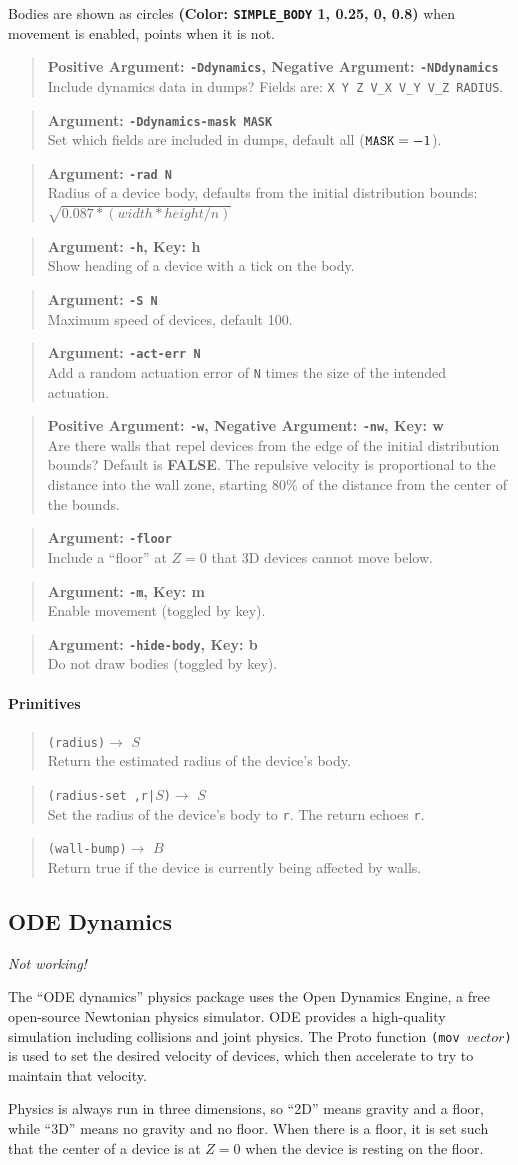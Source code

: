 \documentclass{article}
\newcommand\broken{{\em Not working!}}
\newcommand\false{{\bf FALSE}}
\newcommand\var[1]{{\tt #1}}
\newcommand\key[1]{{\bf #1}}
\newcommand\simarg[2]{\begin{quote} {\bf Argument: \var{#1}} \\ #2 \end{quote}}
\newcommand\simargkey[3]{
  \begin{quote} {\bf Argument: \var{#1}, Key: \key{#2}} \\ #3 \end{quote}
}
\newcommand\simPMarg[3]{
  \begin{quote}
    {\bf Positive Argument: \var{#1}, Negative Argument: \var{#2}} \\ #3
  \end{quote}
}
\newcommand\simPMargkey[4]{
  \begin{quote}
    {\bf Positive Argument: \var{#1}, Negative Argument: \var{#2}, 
      Key: \key{#3}} \\ #4
  \end{quote}
}
\newcommand\color[5]{{\bf (Color: {\tt #1} #2, #3, #4, #5)}} %
\newcommand\function[3]
{\begin{quote}{\tt #1}$\rightarrow$ \type{#2} \\ #3 \end{quote}}
\newcommand\type[1]{$#1$}
\begin{document}
Bodies are shown as circles \color{SIMPLE\_BODY}{1}{0.25}{0}{0.8} when
movement is enabled, points when it is not.

\simPMarg{-Ddynamics}{-NDdynamics}{Include dynamics data in dumps?
  Fields are: \var{X Y Z V\_X V\_Y V\_Z RADIUS}.}
\simarg{-Ddynamics-mask MASK}{Set which fields are included in 
  dumps, default all ($\var{MASK}=-1$).}

\simarg{-rad N}{Radius of a device body, defaults from the initial
  distribution bounds: $\sqrt{0.087*(width*height/n)}$}
\simargkey{-h}{h}{Show heading of a device with a tick on the body.}
\simarg{-S N}{Maximum speed of devices, default 100.}
\simarg{-act-err N}{Add a random actuation error of \var{N} times the
  size of the intended actuation.}
\simPMargkey{-w}{-nw}{w}{Are there walls that repel devices from the
  edge of the initial distribution bounds?  Default is \false{}. The
  repulsive velocity is proportional to the distance into the wall
  zone, starting 80\% of the distance from the center of the bounds.}
\simarg{-floor}{Include a ``floor'' at $Z=0$ that 3D devices cannot
  move below.}
\simargkey{-m}{m}{Enable movement (toggled by key).}
\simargkey{-hide-body}{b}{Do not draw bodies (toggled by key).}

\paragraph{Primitives}

\function{(radius)}{S}{Return the estimated radius of the device's body.}
\function{(radius-set ,r|\type{S})}{S}{Set the radius of the device's
  body to \var{r}.  The return echoes \var{r}.}
\function{(wall-bump)}{B}{Return true if the device is currently being affected by walls.}

\subsection{ODE Dynamics}

\broken{}

The ``ODE dynamics'' physics package uses the Open Dynamics
Engine\cite{ode}, a free open-source Newtonian physics simulator.  ODE
provides a high-quality simulation including collisions and joint
physics.  The Proto function \var{(mov $vector$)} is used to set the
desired velocity of devices, which then accelerate to try to maintain
that velocity.

Physics is always run in three dimensions, so ``2D'' means gravity and
a floor, while ``3D'' means no gravity and no floor.  When there is a
floor, it is set such that the center of a device is at $Z=0$ when the
device is resting on the floor.
\end{document}
